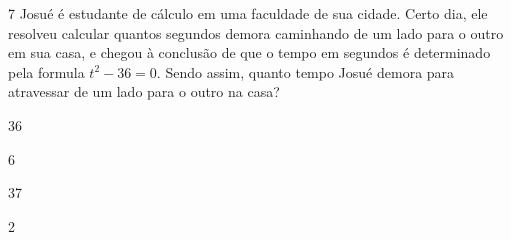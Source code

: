 












\num{7} Josué é estudante de cálculo em uma faculdade de sua cidade. Certo
dia, ele resolveu calcular quantos segundos demora caminhando de um lado
para o outro em sua casa, e chegou à conclusão de que o tempo em
segundos é determinado pela formula $t^2 - 36 = 0$. Sendo assim, quanto
tempo Josué demora para atravessar de um lado para o outro na casa?

\begin{escolha}
\item 36
\item 6
\item 37
\item 2
\end{escolha}










